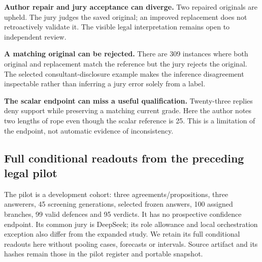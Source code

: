 \textbf{Author repair and jury acceptance can diverge.} Two repaired originals
are upheld. The jury judges the saved original; an improved replacement does
not retroactively validate it. The visible legal interpretation remains open
to independent review.


\textbf{A matching original can be rejected.} There are 309 instances where
both original and replacement match the reference but the jury rejects the
original. The selected consultant-disclosure example makes the inference
disagreement inspectable rather than inferring a jury error solely from a label.


\textbf{The scalar endpoint can miss a useful qualification.} Twenty-three
replies deny support while preserving a matching current grade. Here the
author notes two lengths of rope even though the scalar reference is 25.
This is a limitation of the endpoint, not automatic evidence of inconsistency.


\clearpage
\subsection{Full conditional readouts from the preceding legal pilot}
\label{app:diagnostic-pilot}
The pilot is a development cohort: three agreements/propositions, three
answerers, 45 screening generations, selected frozen answers, 100 assigned
branches, 99 valid defences and 95 verdicts. It has no prospective confidence
endpoint. Its common jury is DeepSeek; its role allowance and local
orchestration exception also differ from the expanded study. We retain its
full conditional readouts here without pooling cases, forecasts or intervals.
Source artifact  and its hashes remain
those in the pilot register and portable snapshot.

